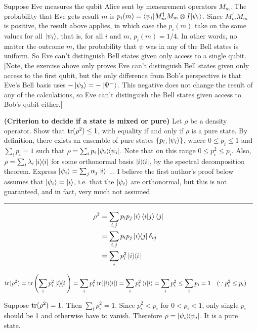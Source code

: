 Suppose Eve measures the qubit Alice sent by measurement operators $M_m$.
The probability that Eve gets result $m$ is $p_i(m) = \braket{\psi_i | M_m^\dagger M_m \otimes I | \psi_i}$.
Since $M ^\dagger_m M_m$ is positive, the result above applies, in which case the $p_i(m)$ take on the same values for all $\ket{\psi_i}$, that is, for all $i$ and $m$, $p_i(m) = 1/4$.  In other words, no matter the outcome $m$, the probability that $\psi$ was in any of the Bell states is uniform.   So Eve can't distinguish Bell states given only access to a single qubit.  [Note, the exercise above only proves Eve can't distinguish Bell states given only access to the first qubit, but the only difference from Bob's perspective is that Eve's Bell basis uses $-\ket{\psi_3}=-\ket{\Psi^-}$.  This negative does not change the result of any of the calculations, so Eve can't distinguish the Bell states given access to Bob's qubit either.]  

 \textbf{(Criterion to decide if a state is mixed or pure)} Let $\rho$ be a density operator.  Show that $\operatorname{tr}(\rho^2) \leq 1$, with equality if and only if $\rho$ is a pure state.
\Soln
By definition, there exists an ensemble of pure states $\{p_i,\ket{\psi_i}\}$, where $0\leq p_i\leq 1$ and $\sum_i p_i = 1$ such that $\rho = \sum_i p_i \ket{\psi_i}\hspace{-1mm} \bra{\psi_i}$.  Note that on this range  $0\leq p_i^2 \leq p_i$. Also, $\rho = \sum_i \lambda_i \ket{i}\hspace{-1mm} \bra{i}$ for some orthonormal basis $\ket{i}\hspace{-1mm} \bra{i}$, by the spectral decomposition theorem.  Express $\ket{\psi_i} = \sum_j \alpha_j \ket{i}$ ... I believe the first author's proof below assumes that $\ket{\psi_i} = \ket{i}$, i.e. that the $\ket{\psi_i}$ are orthonormal, but this is not guaranteed, and in fact, very much not assumed.
\hrule
\begin{align*}
    \rho^2 &= \sum_{i,j} p_i p_j \ket{i}\braket{i|j}\bra{j}\\
        &= \sum_{i,j} p_i p_j \ket{i}\hspace{-1mm} \bra{j}\delta_{ij}\\
        &= \sum_i p_i^2 \ket{i}\hspace{-1mm} \bra{i}
\end{align*}

\begin{align*}
    \operatorname{tr} (\rho^2) &= \operatorname{tr} \left(\sum_i p_i^2 \ket{i}\hspace{-1mm} \bra{i}\right)
        = \sum_i p_i^2 \operatorname{tr}(\ket{i}\hspace{-1mm} \bra{i})
        = \sum_i p_i^2 \braket{i|i}
        = \sum_i p_i^2
        \leq \sum_i p_i = 1~~~ (\because p_i^2 \leq p_i)
\end{align*}

Suppose $\operatorname{tr} (\rho^2) = 1$. Then $\sum_i p_i^2 = 1$.
Since $p_i^2 < p_i$ for $0 < p_i < 1$,
only single $p_i$ should be 1 and otherwise have to  vanish.
Therefore $\rho = \ket{\psi_i}\hspace{-1mm} \bra{\psi_i}$. It is a pure state.

